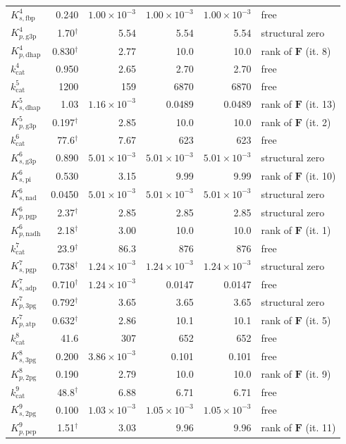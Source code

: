 \begin{longtable}{lrrrrl}
$K_{s,\mathrm{fbp}}^{4}$ & 0.240 & $1.00 \times 10^{-3}$ & $1.00 \times 10^{-3}$ & $1.00 \times 10^{-3}$ & free \\
$K_{p,\mathrm{g3p}}^{4}$ & 1.70$^\dagger$ & 5.54 & 5.54 & 5.54 & structural zero \\
$K_{p,\mathrm{dhap}}^{4}$ & 0.830$^\dagger$ & 2.77 & 10.0 & 10.0 & rank of $\mathbf{F}$ (it. 8) \\
$k_{\mathrm{cat}}^{4}$ & 0.950 & 2.65 & 2.70 & 2.70 & free \\
$k_{\mathrm{cat}}^{5}$ & 1200 & 159 & 6870 & 6870 & free \\
$K_{s,\mathrm{dhap}}^{5}$ & 1.03 & $1.16 \times 10^{-3}$ & 0.0489 & 0.0489 & rank of $\mathbf{F}$ (it. 13) \\
$K_{p,\mathrm{g3p}}^{5}$ & 0.197$^\dagger$ & 2.85 & 10.0 & 10.0 & rank of $\mathbf{F}$ (it. 2) \\
$k_{\mathrm{cat}}^{6}$ & 77.6$^\dagger$ & 7.67 & 623 & 623 & free \\
$K_{s,\mathrm{g3p}}^{6}$ & 0.890 & $5.01 \times 10^{-3}$ & $5.01 \times 10^{-3}$ & $5.01 \times 10^{-3}$ & structural zero \\
$K_{s,\mathrm{pi}}^{6}$ & 0.530 & 3.15 & 9.99 & 9.99 & rank of $\mathbf{F}$ (it. 10) \\
$K_{s,\mathrm{nad}}^{6}$ & 0.0450 & $5.01 \times 10^{-3}$ & $5.01 \times 10^{-3}$ & $5.01 \times 10^{-3}$ & structural zero \\
$K_{p,\mathrm{pgp}}^{6}$ & 2.37$^\dagger$ & 2.85 & 2.85 & 2.85 & structural zero \\
$K_{p,\mathrm{nadh}}^{6}$ & 2.18$^\dagger$ & 3.00 & 10.0 & 10.0 & rank of $\mathbf{F}$ (it. 1) \\
$k_{\mathrm{cat}}^{7}$ & 23.9$^\dagger$ & 86.3 & 876 & 876 & free \\
$K_{s,\mathrm{pgp}}^{7}$ & 0.738$^\dagger$ & $1.24 \times 10^{-3}$ & $1.24 \times 10^{-3}$ & $1.24 \times 10^{-3}$ & structural zero \\
$K_{s,\mathrm{adp}}^{7}$ & 0.710$^\dagger$ & $1.24 \times 10^{-3}$ & 0.0147 & 0.0147 & free \\
$K_{p,\mathrm{3pg}}^{7}$ & 0.792$^\dagger$ & 3.65 & 3.65 & 3.65 & structural zero \\
$K_{p,\mathrm{atp}}^{7}$ & 0.632$^\dagger$ & 2.86 & 10.1 & 10.1 & rank of $\mathbf{F}$ (it. 5) \\
$k_{\mathrm{cat}}^{8}$ & 41.6 & 307 & 652 & 652 & free \\
$K_{s,\mathrm{3pg}}^{8}$ & 0.200 & $3.86 \times 10^{-3}$ & 0.101 & 0.101 & free \\
$K_{p,\mathrm{2pg}}^{8}$ & 0.190 & 2.79 & 10.0 & 10.0 & rank of $\mathbf{F}$ (it. 9) \\
$k_{\mathrm{cat}}^{9}$ & 48.8$^\dagger$ & 6.88 & 6.71 & 6.71 & free \\
$K_{s,\mathrm{2pg}}^{9}$ & 0.100 & $1.03 \times 10^{-3}$ & $1.05 \times 10^{-3}$ & $1.05 \times 10^{-3}$ & free \\
$K_{p,\mathrm{pep}}^{9}$ & 1.51$^\dagger$ & 3.03 & 9.96 & 9.96 & rank of $\mathbf{F}$ (it. 11) \\
\end{longtable}

